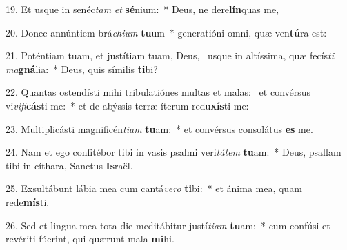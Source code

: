 19. Et usque in senéc\textit{tam} \textit{et} \textbf{sé}nium:~*  Deus, ne dere\textbf{lín}quas me,\

20. Donec annúntiem brá\textit{chi}\textit{um} \textbf{tu}um~*  generatióni omni, quæ ven\textbf{tú}ra est:\

21. Poténtiam tuam, et justítiam tuam, Deus, \dag\  usque in altíssima, quæ fecís\textit{ti} \textit{ma}\textbf{gná}lia:~*  Deus, quis símilis \textbf{ti}bi?\

22. Quantas ostendísti mihi tribulatiónes multas et malas: \dag\  et convérsus vi\textit{vi}\textit{fi}\textbf{cás}ti me:~*  et de abýssis terræ íterum redu\textbf{xís}ti me:\

23. Multiplicásti magnificén\textit{ti}\textit{am} \textbf{tu}am:~*  et convérsus consolátus \textbf{es} me.\

24. Nam et ego confitébor tibi in vasis psalmi veri\textit{tá}\textit{tem} \textbf{tu}am:~*  Deus, psallam tibi in cíthara, Sanctus \textbf{Is}raël.\

25. Exsultábunt lábia mea cum cantá\textit{ve}\textit{ro} \textbf{ti}bi:~*  et ánima mea, quam rede\textbf{mís}ti.\

26. Sed et lingua mea tota die meditábitur justí\textit{ti}\textit{am} \textbf{tu}am:~*  cum confúsi et revériti fúerint, qui quærunt mala \textbf{mi}hi.\

